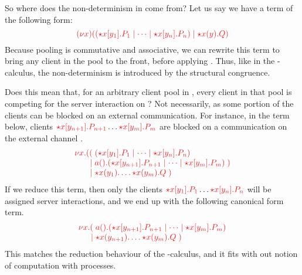 \documentclass[UKenglish]{llncs}
\begin{document}
So where does the non-determinism in \nodcap come from? Let us say we have a
term of the following form:
\[
  \tm{
    \cpCut{x}
    {\ncPool{\ncCnt{x}{y_1}{P_1}}{\dots \mid \ncCnt{x}{y_n}{P_n}}}
    {\ncSrv{x}{y}{Q}}
  }
\]
Because pooling is commutative and associative, we can rewrite this term to
bring any client in the pool to the front, before applying .
Thus, like in the \textpi-calculus, the non-determinism is introduced by the
structural congruence.

Does this mean that, for an arbitrary client pool  in
, every client in that pool is competing for
the server interaction on ?
Not necessarily, as some portion of the clients can be blocked on an external
communication. For instance, in the term below, clients
$\tm{\ncCnt{x}{y_{n+1}}{P_{n+1}}} \dots \tm{\ncCnt{x}{y_m}{P_m}}$ are blocked
on a communication on the external channel .
\[
  \arraycolsep=0pt
  \tm{
  \begin{array}{lrl}
    \nu x.&  ((&\; \ncPool{\ncCnt{x}{y_1}{P_1}}{\dots\mid\ncCnt{x}{y_n}{P_n}}\\
          &\mid&\; \cpWait{a}{\ncPool{\ncCnt{x}{y_{n+1}}{P_{n+1}}}{\dots \mid \ncCnt{x}{y_m}{P_m}}}\;)\\
          &\mid&\; \ncSrv{x}{y_1}{\dots\ncSrv{x}{y_m}{Q}}\;)
  \end{array}}
\]
If we reduce this term, then only the clients
$\tm{\ncCnt{x}{y_1}{P_1}} \dots \tm{\ncCnt{x}{y_n}{P_n}}$
will be assigned server interactions, and we end up with the following canonical
form term. 
\[
  \arraycolsep=0pt
  \tm{
  \begin{array}{lrl}
    \nu x.&   (&\; \cpWait{a}{\ncPool{\ncCnt{x}{y_{n+1}}{P_{n+1}}}{\dots\mid\ncCnt{x}{y_m}{P_m}}}\\
          &\mid&\; \ncSrv{x}{y_{n+1}}{\dots\ncSrv{x}{y_m}{Q}}\;)
  \end{array}}
\]
This matches the reduction behaviour of the \textpi-calculus, and it fits with
out notion of computation with processes.
\end{document}
